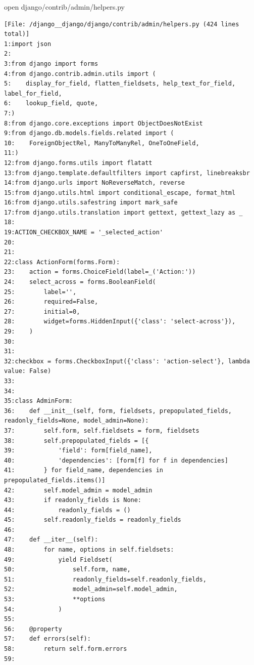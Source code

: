 {\begin{agentbox}
\hrulefill
\begin{CodeVerbatim}[breaklines=true, breakanywhere=true]
open django/contrib/admin/helpers.py
\end{CodeVerbatim}
\end{agentbox}
\begin{observationbox}\begin{Verbatim}[breaklines=true, breakanywhere=true]
[File: /django__django/django/contrib/admin/helpers.py (424 lines total)]
1:import json
2:
3:from django import forms
4:from django.contrib.admin.utils import (
5:    display_for_field, flatten_fieldsets, help_text_for_field, label_for_field,
6:    lookup_field, quote,
7:)
8:from django.core.exceptions import ObjectDoesNotExist
9:from django.db.models.fields.related import (
10:    ForeignObjectRel, ManyToManyRel, OneToOneField,
11:)
12:from django.forms.utils import flatatt
13:from django.template.defaultfilters import capfirst, linebreaksbr
14:from django.urls import NoReverseMatch, reverse
15:from django.utils.html import conditional_escape, format_html
16:from django.utils.safestring import mark_safe
17:from django.utils.translation import gettext, gettext_lazy as _
18:
19:ACTION_CHECKBOX_NAME = '_selected_action'
20:
21:
22:class ActionForm(forms.Form):
23:    action = forms.ChoiceField(label=_('Action:'))
24:    select_across = forms.BooleanField(
25:        label='',
26:        required=False,
27:        initial=0,
28:        widget=forms.HiddenInput({'class': 'select-across'}),
29:    )
30:
31:
32:checkbox = forms.CheckboxInput({'class': 'action-select'}, lambda value: False)
33:
34:
35:class AdminForm:
36:    def __init__(self, form, fieldsets, prepopulated_fields, readonly_fields=None, model_admin=None):
37:        self.form, self.fieldsets = form, fieldsets
38:        self.prepopulated_fields = [{
39:            'field': form[field_name],
40:            'dependencies': [form[f] for f in dependencies]
41:        } for field_name, dependencies in prepopulated_fields.items()]
42:        self.model_admin = model_admin
43:        if readonly_fields is None:
44:            readonly_fields = ()
45:        self.readonly_fields = readonly_fields
46:
47:    def __iter__(self):
48:        for name, options in self.fieldsets:
49:            yield Fieldset(
50:                self.form, name,
51:                readonly_fields=self.readonly_fields,
52:                model_admin=self.model_admin,
53:                **options
54:            )
55:
56:    @property
57:    def errors(self):
58:        return self.form.errors
59:

\end{Verbatim}
\end{observationbox}}
